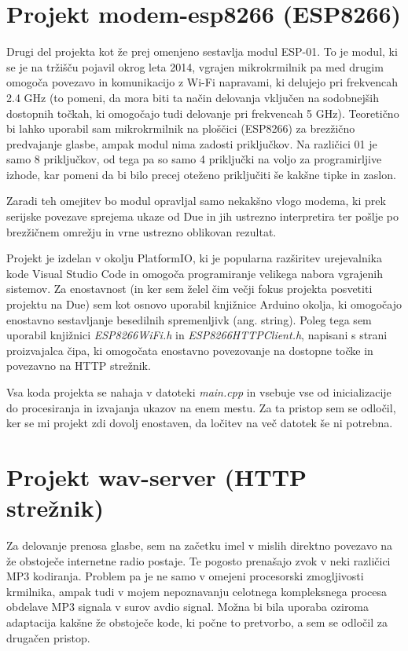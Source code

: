 \documentclass[12pt,a4paper,twoside,openright,slovene]{book}
\begin{document}
\section{Projekt modem-esp8266 (ESP8266)} \label{modem_esp8266_projekt}
Drugi del projekta kot že prej omenjeno sestavlja modul ESP-01. To je modul, ki se je na tržišču pojavil okrog leta 2014, vgrajen mikrokrmilnik pa med drugim omogoča povezavo in komunikacijo z Wi-Fi napravami, ki delujejo pri frekvencah 2.4 GHz (to pomeni, da mora biti ta način delovanja vključen na sodobnejših dostopnih točkah, ki omogočajo tudi delovanje pri frekvencah 5 GHz). Teoretično bi lahko uporabil sam mikrokrmilnik na ploščici (ESP8266) za brezžično predvajanje glasbe, ampak modul nima zadosti priključkov. Na različici 01 je samo 8 priključkov, od tega pa so samo 4 priključki na voljo za programirljive izhode, kar pomeni da bi bilo precej oteženo priključiti še kakšne tipke in zaslon.

Zaradi teh omejitev bo modul opravljal samo nekakšno vlogo modema, ki prek serijske povezave sprejema ukaze od Due in jih ustrezno interpretira ter pošlje po brezžičnem omrežju in vrne ustrezno oblikovan rezultat.

Projekt je izdelan v okolju PlatformIO, ki je popularna razširitev urejevalnika kode Visual Studio Code in omogoča programiranje velikega nabora vgrajenih sistemov. Za enostavnost (in ker sem želel čim večji fokus projekta posvetiti projektu na Due) sem kot osnovo uporabil knjižnice Arduino okolja, ki omogočajo enostavno sestavljanje besedilnih spremenljivk (ang. string). Poleg tega sem uporabil knjižnici \textit{ESP8266WiFi.h} in \textit{ESP8266HTTPClient.h}, napisani s strani proizvajalca čipa, ki omogočata enostavno povezovanje na dostopne točke in povezavno na HTTP strežnik.

Vsa koda projekta se nahaja v datoteki \textit{main.cpp} in vsebuje vse od inicializacije do procesiranja in izvajanja ukazov na enem mestu. Za ta pristop sem se odločil, ker se mi projekt zdi dovolj enostaven, da ločitev na več datotek še ni potrebna.



\section{Projekt wav-server (HTTP strežnik)} \label{wav_server_projekt}
Za delovanje prenosa glasbe, sem na začetku imel v mislih direktno povezavo na že obstoječe internetne radio postaje. Te pogosto prenašajo zvok v neki različici MP3 kodiranja. Problem pa je ne samo v omejeni procesorski zmogljivosti krmilnika, ampak tudi v mojem nepoznavanju celotnega kompleksnega procesa obdelave MP3 signala v surov avdio signal. Možna bi bila uporaba oziroma adaptacija kakšne že obstoječe kode, ki počne to pretvorbo, a sem se odločil za drugačen pristop.
\end{document}
